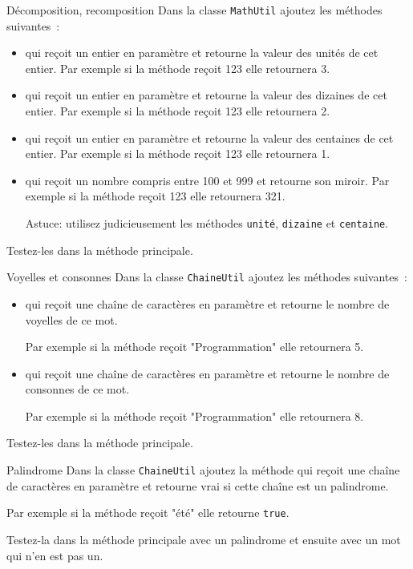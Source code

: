 \documentclass[a4paper,11pt]{article}
\begin{document}
	\begin{Exercice}{Décomposition, recomposition}
		Dans la classe \texttt{MathUtil} ajoutez les méthodes suivantes~: 
		\begin{itemize}
			\item {} qui reçoit un entier en paramètre et retourne la valeur des unités de cet entier.
				Par exemple si la méthode reçoit 123 elle retournera 3.
			\item {} qui reçoit un entier en paramètre et retourne la valeur des dizaines de cet entier.
				Par exemple si la méthode reçoit 123 elle retournera 2.
			\item {} qui reçoit un entier en paramètre et retourne la valeur des centaines de cet entier.
				Par exemple si la méthode reçoit 123 elle retournera 1.
			\item {} qui reçoit un nombre compris entre 100 et 999 et retourne son miroir.
				Par exemple si la méthode reçoit 123 elle retournera 321.
				
				Astuce: utilisez judicieusement les méthodes \texttt{unité}, \texttt{dizaine} et \texttt{centaine}.
		\end{itemize}
		Testez-les dans la méthode principale.
	\end{Exercice} 
	
	\begin{Exercice}{Voyelles et consonnes}
		Dans la classe \texttt{ChaineUtil} ajoutez les méthodes suivantes~: 
		\begin{itemize}
			\item {} 
				qui reçoit une chaîne de caractères en paramètre et retourne le nombre de voyelles de ce mot.
				
				Par exemple si la méthode reçoit "Programmation" elle retournera 5.
			\item {} 
				qui reçoit une chaîne de caractères en paramètre et retourne le nombre de consonnes de ce mot.
				
				Par exemple si la méthode reçoit "Programmation" elle retournera 8.
		\end{itemize}
		Testez-les dans la méthode principale.
	\end{Exercice} 

	 \begin{Exercice}{Palindrome}
		Dans la classe \texttt{ChaineUtil} ajoutez la méthode 
		 qui reçoit une chaîne de caractères en paramètre et 
		retourne vrai si cette chaîne est un palindrome.
		
		Par exemple si la méthode reçoit "été" elle retourne \texttt{true}.
		
		Testez-la dans la méthode principale avec un palindrome et ensuite avec un mot qui n'en est pas un.
	\end{Exercice} 
\end{document}

